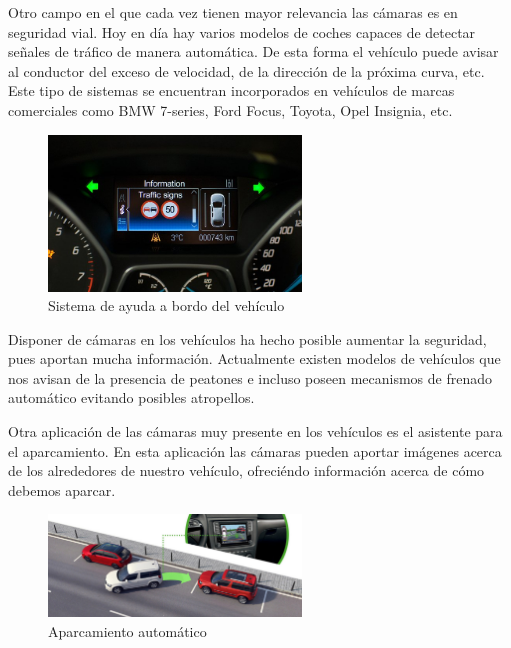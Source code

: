 Otro campo en el que cada vez tienen mayor relevancia las cámaras es en seguridad vial. Hoy en día hay varios modelos de coches capaces de detectar señales de tráfico de manera automática. De esta forma el vehículo puede avisar al conductor del exceso de velocidad, de la dirección de la próxima curva, etc. Este tipo de sistemas se encuentran incorporados en vehículos de marcas comerciales como BMW 7-series, Ford Focus, Toyota, Opel Insignia, etc.

\begin{figure}[H]
  \begin{center}
    \includegraphics[width=0.6\textwidth]{figures/Introduccion/deteccion_senales.jpg}
		\caption{Sistema de ayuda a bordo del vehículo}
		\label{fig.deteccion_senales}
		\end{center}
\end{figure}

Disponer de cámaras en los vehículos ha hecho posible aumentar la seguridad, pues aportan mucha información. Actualmente existen modelos de vehículos que nos avisan de la presencia de peatones e incluso poseen mecanismos de frenado automático evitando posibles atropellos.

Otra aplicación de las cámaras muy presente en los vehículos es el asistente para el aparcamiento.  En esta aplicación las cámaras pueden aportar imágenes acerca de los alrededores de nuestro vehículo, ofreciéndo información acerca de cómo debemos aparcar.

\begin{figure}[H]
  \begin{center}
    \includegraphics[width=0.6\textwidth]{figures/Introduccion/aparcamiento_automatico.jpg}
		\caption{Aparcamiento automático}
		\label{fig.aparcamiento_automatico}
		\end{center}
\end{figure}

